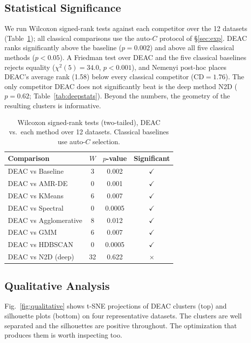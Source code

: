 \documentclass[conference]{IEEEtran}
\begin{document}
\subsection{Statistical Significance}

We run Wilcoxon signed-rank tests against each competitor over the 12 datasets (Table~\ref{tab:stats}); all classical comparisons use the auto-$C$ protocol of \S\ref{sec:exp}. DEAC ranks significantly above the baseline ($p{=}0.002$) and above all five classical methods ($p<0.05$). A Friedman test over DEAC and the five classical baselines rejects equality ($\chi^2(5){=}34.0$, $p{<}0.001$), and Nemenyi post-hoc places DEAC's average rank (1.58) below every classical competitor (CD${=}1.76$). The only competitor DEAC does not significantly beat is the deep method N2D ($p{=}0.62$; Table~\ref{tab:deepstats}). Beyond the numbers, the geometry of the resulting clusters is informative.

\begin{table}[htbp]
\centering
\caption{Wilcoxon signed-rank tests (two-tailed), DEAC vs.\ each method over 12 datasets. Classical baselines use auto-$C$ selection.}
\label{tab:stats}
\footnotesize
\begin{tabular}{lccc}
\toprule
Comparison & $W$ & $p$-value & Significant \\
\midrule
DEAC vs Baseline      & 3 & 0.002 & $\checkmark$ \\
DEAC vs AMR-DE        & 0 & 0.001 & $\checkmark$ \\
DEAC vs KMeans        & 6 & 0.007 & $\checkmark$ \\
DEAC vs Spectral      & 0 & 0.0005 & $\checkmark$ \\
DEAC vs Agglomerative & 8 & 0.012 & $\checkmark$ \\
DEAC vs GMM           & 6 & 0.007 & $\checkmark$ \\
DEAC vs HDBSCAN       & 0 & 0.0005 & $\checkmark$ \\
DEAC vs N2D (deep)    & 32 & 0.622 & $\times$ \\
\bottomrule
\end{tabular}
\end{table}

\subsection{Qualitative Analysis}

Fig.~\ref{fig:qualitative} shows t-SNE projections of DEAC clusters (top) and silhouette plots (bottom) on four representative datasets. The clusters are well separated and the silhouettes are positive throughout. The optimization that produces them is worth inspecting too.
\end{document}
